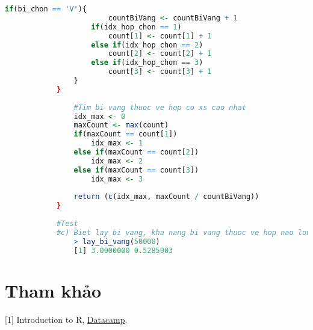 \documentclass[a4paper,12pt]{article}
\begin{document}
\begin{itemize}
\begin{lstlisting}[language=R]
					if(bi_chon == 'V'){
						countBiVang <- countBiVang + 1
					if(idx_hop_chon == 1)
						count[1] <- count[1] + 1
					else if(idx_hop_chon == 2)
						count[2] <- count[2] + 1
					else if(idx_hop_chon == 3)
						count[3] <- count[3] + 1
				}
			}
			
				#Tim bi vang thuoc ve hop co xs cao nhat
				idx_max <- 0
				maxCount <- max(count)
				if(maxCount == count[1])
					idx_max <- 1
				else if(maxCount == count[2])
					idx_max <- 2
				else if(maxCount == count[3])
					idx_max <- 3
			
				return (c(idx_max, maxCount / countBiVang))
			}
			
			#Test
			#c) Biet lay bi vang, kha nang bi vang thuoc ve hop nao lon nhat?
				> lay_bi_vang(50000)
				[1] 3.0000000 0.5285903
		\end{lstlisting}
		
	\end{itemize}

	\section{Tham khảo}
	\label{Tham khao}
	[1] Introduction to R, \href{https://campus.datacamp.com/courses/free-introduction-to-r}{Datacamp}. \\

		
\end{document}
